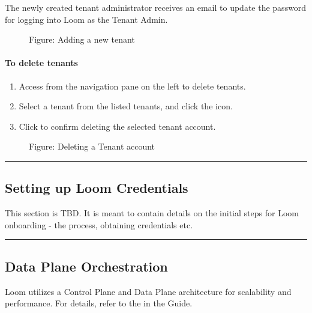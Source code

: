 \documentclass[letterpaper,10pt,english]{sphinxmanual}
\begin{document}
The newly created tenant administrator receives an email to update the password for logging into Loom as the Tenant Admin.

\begin{figure}[htbp]
\centering
\capstart

\noindent{}
\caption{Figure: Adding a new tenant}\label{\detokenize{loom_getting_started_guide:id39}}\end{figure}


\paragraph{To delete tenants}
\label{\detokenize{loom_getting_started_guide:to-delete-tenants}}\begin{enumerate}
\item {} 
Access  from the navigation pane on the left to delete tenants.

\item {} 
Select a tenant from the listed tenants, and click the  icon.

\item {} 
Click  to confirm deleting the selected tenant account.

\end{enumerate}

\begin{figure}[htbp]
\centering
\capstart

\noindent{}
\caption{Figure: Deleting a Tenant account}\label{\detokenize{loom_getting_started_guide:id40}}\end{figure}


\bigskip\hrule\bigskip



\subsection{Setting up Loom Credentials}
\label{\detokenize{loom_getting_started_guide:setting-up-loom-credentials}}
This section is TBD. It is meant to contain details on the initial steps for Loom onboarding - the process, obtaining credentials etc.


\bigskip\hrule\bigskip



\subsection{Data Plane Orchestration}
\label{\detokenize{loom_getting_started_guide:data-plane-orchestration}}
Loom utilizes a Control Plane and Data Plane architecture for scalability and performance.  For details, refer to the  in the  Guide.
\end{document}
